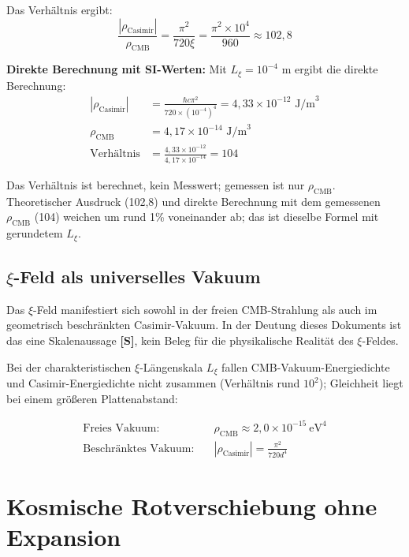 	Das Verhältnis ergibt:
	\begin{equation}
		\frac{|\rho_{\text{Casimir}}|}{\rho_{\text{CMB}}} = \frac{\pi^2}{720 \xi} = \frac{\pi^2 \times 10^4}{960} \approx 102{,}8
	\end{equation}

	\textbf{Direkte Berechnung mit SI-Werten:}
	Mit $L_\xi = 10^{-4}$ m ergibt die direkte Berechnung:
	\begin{align}
		|\rho_{\text{Casimir}}| &= \frac{\hbar c \pi^2}{720 \times (10^{-4})^4} = 4{,}33 \times 10^{-12} \text{ J/m}^3 \\
		\rho_{\text{CMB}} &= 4{,}17 \times 10^{-14} \text{ J/m}^3 \\
		\text{Verhältnis} &= \frac{4{,}33 \times 10^{-12}}{4{,}17 \times 10^{-14}} = 104
	\end{align}
	
	Das Verhältnis ist berechnet, kein Messwert; gemessen ist nur $\rho_{\text{CMB}}$. Theoretischer Ausdruck (102{,}8) und direkte Berechnung mit dem gemessenen $\rho_{\text{CMB}}$ (104) weichen um rund 1\% voneinander ab; das ist dieselbe Formel mit gerundetem $L_\xi$.
	
	\subsection{$\xi$-Feld als universelles Vakuum}
	
	\begin{important}
		Das $\xi$-Feld manifestiert sich sowohl in der freien CMB-Strahlung als auch im geometrisch beschränkten Casimir-Vakuum. In der Deutung dieses Dokuments ist das eine Skalenaussage \textbf{[S]}, kein Beleg für die physikalische Realität des $\xi$-Feldes.
	\end{important}
	
	Bei der charakteristischen $\xi$-Längenskala $L_\xi$ fallen CMB-Vakuum-Energiedichte und Casimir-Energiedichte nicht zusammen (Verhältnis rund $10^2$); Gleichheit liegt bei einem größeren Plattenabstand:
	
	\begin{align}
		\text{Freies Vakuum:} \quad &\rho_{\text{CMB}} \approx 2{,}0 \times 10^{-15}\ \text{eV}^4 \\
		\text{Beschränktes Vakuum:} \quad &|\rho_{\text{Casimir}}| = \frac{\pi^2}{720 d^4}
	\end{align}
	
	\section{Kosmische Rotverschiebung ohne Expansion}
	
